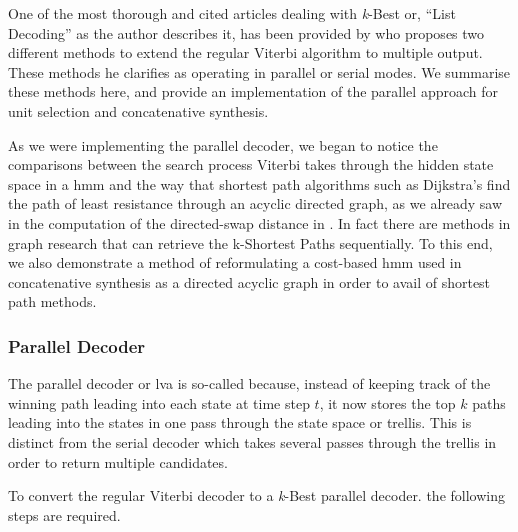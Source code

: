 {{{{{{{{One of the most thorough and cited articles dealing with \textit{k}-Best or, ``List Decoding'' as the author describes it, has been provided by \cite{Seshadri1994} who proposes two different methods to extend the regular Viterbi algorithm to multiple output. These methods he clarifies  as operating in parallel or serial modes. We summarise these methods here, and provide an implementation of the parallel approach for unit selection and concatenative synthesis.

As we were implementing the parallel decoder, we began to notice the comparisons between the search process Viterbi takes through the hidden state space in a \acrshort{hmm} and the way that shortest path algorithms such as Dijkstra's find the path of least resistance through an acyclic directed graph, as we already saw in the computation of the directed-swap distance in . In fact there are methods in graph research that can retrieve the k-Shortest Paths sequentially. To this end, we also demonstrate a method of reformulating a cost-based \acrshort{hmm} used in concatenative synthesis as a directed acyclic graph in order to avail of shortest path methods.

\subsubsection{Parallel Decoder}

The parallel decoder \citep{Seshadri1994} or \acrfull{lva} is so-called because, instead of keeping track of the winning path leading into each state at time step $t$, it now stores the top $k$ paths leading into the states in one pass through the state space or trellis. This is distinct from the serial decoder which takes several passes through the trellis in order to return multiple candidates.

To convert the regular Viterbi decoder to a \textit{k}-Best parallel decoder. the following steps are required.

}}}}}}}}
